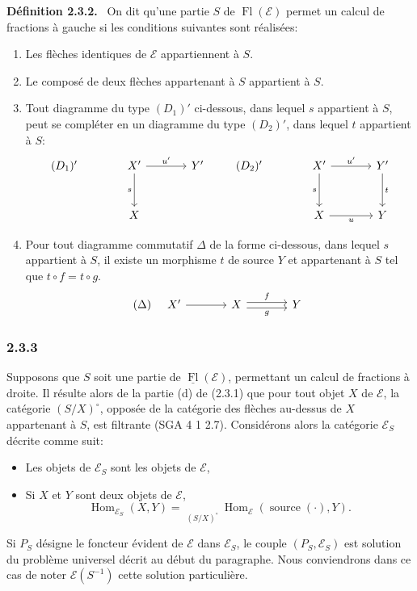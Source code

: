 \documentclass[11pt]{article}
\newenvironment{statement}[1]{\par\medskip\noindent\textbf{#1.}\ }{\par\medskip}
\DeclareMathOperator{\Hom}{Hom}
\providecommand{\Hom}{\operatorname{Hom}}
\providecommand{\Fl}{\operatorname{Fl}}
\providecommand{\cE}{\mathcal E}
\providecommand{\source}{\operatorname{source}}
\providecommand{\Hom}{\operatorname{Hom}}
\begin{document}
\begin{statement}{Définition 2.3.2}
On dit qu'une partie $S$ de $\Fl(\cE)$ permet un calcul de fractions à gauche si les conditions suivantes sont réalisées:
\begin{enumerate}[label=(\alph*)]
\item[(a')] Les flèches identiques de $\cE$ appartiennent à $S$.
\item[(b')] Le composé de deux flèches appartenant à $S$ appartient à $S$.
\item[(c')] Tout diagramme du type $(D_1)'$ ci-dessous, dans lequel $s$ appartient à $S$,
peut se compléter en un diagramme du type $(D_2)'$, dans lequel $t$ appartient à $S$:
\[
\begin{tikzcd}[column sep=large,row sep=large]
(D_1)'& X' \arrow[r,"u'"] \arrow[d,"s"'] & Y'\\
& X
\end{tikzcd}
\qquad
\begin{tikzcd}[column sep=large,row sep=large]
(D_2)'& X' \arrow[r,"u'"] \arrow[d,"s"'] & Y' \arrow[d,"t"]\\
& X \arrow[r,"u"'] & Y
\end{tikzcd}
\]
\item[(d)'] Pour tout diagramme commutatif $\Delta$ de la forme ci-dessous, dans lequel $s$ appartient à $S$, il existe un morphisme $t$ de source $Y$ et appartenant à $S$ tel que $t\circ f=t\circ g$.
\[
(\Delta)\quad
\begin{tikzcd}[column sep=large]
X' \arrow[r] & X \arrow[r,shift left,"f"] \arrow[r,shift right,"g"'] & Y
\end{tikzcd}
\]
\end{enumerate}
\end{statement}

\subsubsection*{2.3.3}
Supposons que $S$ soit une partie de $\underline{\Fl}(\cE)$, permettant un calcul de fractions à droite. Il résulte alors de la partie (d) de (2.3.1) que pour tout objet $X$ de $\cE$, la catégorie $(S/X)^\circ$, opposée de la catégorie des flèches au-dessus de $X$ appartenant à $S$, est filtrante (SGA 4 1 2.7). Considérons alors la catégorie $\cE_S$ décrite comme suit:
\begin{itemize}[label=-]
\item Les objets de $\cE_S$ sont les objets de $\cE$,
\item Si $X$ et $Y$ sont deux objets de $\cE$,
\[
\Hom_{\cE_S}(X,Y)=\mathop{\underrightarrow{\mathrm{Lim}}}\limits_{(S/X)^\circ}\Hom_{\cE}(\source(\cdot),Y).
\]
\end{itemize}
Si $P_S$ désigne le foncteur évident de $\cE$ dans $\cE_S$, le couple $(P_S,\cE_S)$ est solution du problème universel décrit au début du paragraphe. Nous conviendrons dans ce cas de noter $\cE(S^{-1})$ cette solution particulière.
\end{document}
